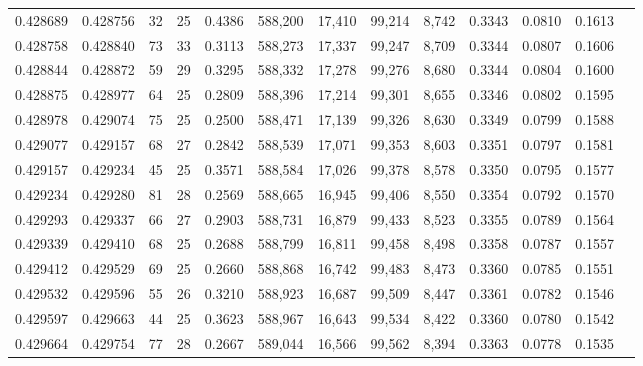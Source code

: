 \begin{tabular}{rrrrrrrrrrrrr}
0.428689 & 0.428756 &    32 &  25 &                                     0.4386 & 588,200 &  17,410 &  99,214 &   8,742 & 0.3343 & 0.0810 & 0.1613 \\
0.428758 & 0.428840 &    73 &  33 &                                     0.3113 & 588,273 &  17,337 &  99,247 &   8,709 & 0.3344 & 0.0807 & 0.1606 \\
0.428844 & 0.428872 &    59 &  29 &                                     0.3295 & 588,332 &  17,278 &  99,276 &   8,680 & 0.3344 & 0.0804 & 0.1600 \\
0.428875 & 0.428977 &    64 &  25 &                                     0.2809 & 588,396 &  17,214 &  99,301 &   8,655 & 0.3346 & 0.0802 & 0.1595 \\
0.428978 & 0.429074 &    75 &  25 &                                     0.2500 & 588,471 &  17,139 &  99,326 &   8,630 & 0.3349 & 0.0799 & 0.1588 \\
0.429077 & 0.429157 &    68 &  27 &                                     0.2842 & 588,539 &  17,071 &  99,353 &   8,603 & 0.3351 & 0.0797 & 0.1581 \\
0.429157 & 0.429234 &    45 &  25 &                                     0.3571 & 588,584 &  17,026 &  99,378 &   8,578 & 0.3350 & 0.0795 & 0.1577 \\
0.429234 & 0.429280 &    81 &  28 &                                     0.2569 & 588,665 &  16,945 &  99,406 &   8,550 & 0.3354 & 0.0792 & 0.1570 \\
0.429293 & 0.429337 &    66 &  27 &                                     0.2903 & 588,731 &  16,879 &  99,433 &   8,523 & 0.3355 & 0.0789 & 0.1564 \\
0.429339 & 0.429410 &    68 &  25 &                                     0.2688 & 588,799 &  16,811 &  99,458 &   8,498 & 0.3358 & 0.0787 & 0.1557 \\
0.429412 & 0.429529 &    69 &  25 &                                     0.2660 & 588,868 &  16,742 &  99,483 &   8,473 & 0.3360 & 0.0785 & 0.1551 \\
0.429532 & 0.429596 &    55 &  26 &                                     0.3210 & 588,923 &  16,687 &  99,509 &   8,447 & 0.3361 & 0.0782 & 0.1546 \\
0.429597 & 0.429663 &    44 &  25 &                                     0.3623 & 588,967 &  16,643 &  99,534 &   8,422 & 0.3360 & 0.0780 & 0.1542 \\
0.429664 & 0.429754 &    77 &  28 &                                     0.2667 & 589,044 &  16,566 &  99,562 &   8,394 & 0.3363 & 0.0778 & 0.1535 \\

\end{tabular}
